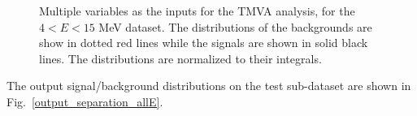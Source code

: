 \begin{figure}[htbp]
{\begin{minipage}[b]{0.3\textwidth}
   \end{minipage}
   }
	\caption[Multiple variables as the inputs for the TMVA analysis, for the $4<E<15$ MeV dataset.]{Multiple variables as the inputs for the TMVA analysis, for the $4<E<15$ MeV dataset. The distributions of the backgrounds are show in dotted red lines while the signals are shown in solid black lines. The distributions are normalized to their integrals.\label{fig:inputParamsTMVA}}
\end{figure}

The output signal/background distributions on the test sub-dataset are shown in Fig.~\ref{output_separation_allE}.
